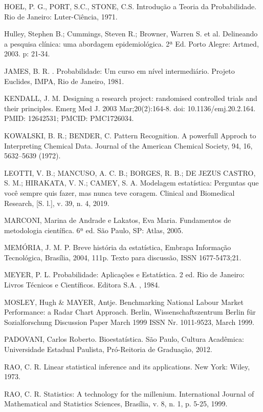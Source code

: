 HOEL, P. G., PORT, S.C., STONE, C.S. Introdução a Teoria da Probabilidade. Rio de
Janeiro: Luter-Ciência, 1971.\vskip0.3cm

Hulley, Stephen B.; Cummings, Steven R.; Browner, Warren S. et al. Delineando a pesquisa clínica: uma abordagem epidemiológica. 2ª Ed. Porto Alegre: Artmed, 2003. p: 21-34.\vskip0.3cm

JAMES, B. R. . Probabilidade: Um curso em nível intermediário.
Projeto Euclides, IMPA, Rio de Janeiro, 1981. \vskip0.3cm


KENDALL, J. M. Designing a research project: randomised controlled trials and their principles. Emerg Med J. 2003 Mar;20(2):164-8. doi: 10.1136/emj.20.2.164. PMID: 12642531; PMCID: PMC1726034.\vskip0.3cm

KOWALSKI, B. R.; BENDER, C. Pattern Recognition. A powerfull Approch to Interpreting Chemical Data. Journal of the American Chemical Society, 94, 16, 5632–5639 (1972).\vskip0.3cm



LEOTTI, V. B.; MANCUSO, A. C. B.; BORGES, R. B.; DE JEZUS CASTRO, S. M.; HIRAKATA, V. N.; CAMEY, S. A. Modelagem estatística: Perguntas que você sempre quis fazer, mas nunca teve coragem. Clinical and Biomedical Research, [S. l.], v. 39, n. 4, 2019.\vskip0.3cm


MARCONI, Marina de Andrade e Lakatos, Eva Maria. Fundamentos de metodologia científica. 6ª ed. São Paulo, SP: Atlas, 2005.\vskip0.3cm

MEMÓRIA, J. M. P. Breve história da estatística, Embrapa Informação Tecnológica, Brasília, 2004, 111p. Texto para discussão, ISSN 1677-5473;21. \vskip0.3cm

MEYER, P. L. Probabilidade: Aplicações e Estatística. 2 ed.
Rio de Janeiro: Livros Técnicos e Científicos. Editora S.A. ,
1984.\vskip0.3cm


MOSLEY, Hugh \& MAYER, Antje. Benchmarking National Labour Market
Performance: a Radar Chart Approach. Berlin, Wissenschaftszentrum Berlin
für Sozialforschung Discussion Paper March 1999 ISSN Nr. 1011-9523, March
1999.\vskip0.3cm


PADOVANI, Carlos Roberto. Bioestatística. São Paulo, Cultura Acadêmica:
Universidade Estadual Paulista, Pró-Reitoria de Graduação, 2012.\vskip0.3cm

RAO, C. R. Linear statistical inference and its applications. New York: Wiley, 1973.\vskip0.3cm

RAO, C. R. Statistics: A technology for the millenium. International Journal of Mathematical and Statistics Sciences, Brasília, v. 8, n. 1, p. 5-25, 1999.\vskip0.3cm

